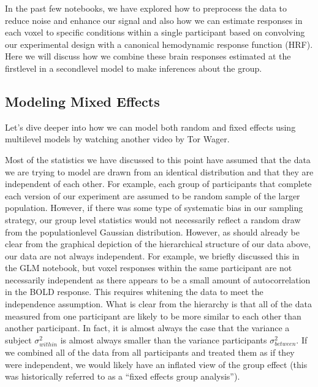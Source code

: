 \documentclass[letterpaper,10pt,english]{sphinxmanual}
\begin{document}

In the past few notebooks, we have explored how to preprocess the data to reduce noise and enhance our signal and also how we can estimate responses in each voxel to specific conditions within a single participant based on convolving our experimental design with a canonical hemodynamic response function (HRF). Here we will discuss how we combine these brain responses estimated at the first\sphinxhyphen{}level in a second\sphinxhyphen{}level model to make inferences about the group.


\subsection{Modeling Mixed Effects}
\label{\detokenize{content/Group_Analysis:modeling-mixed-effects}}
Let’s dive deeper into how we can model both random and fixed effects using multi\sphinxhyphen{}level models by watching another video by Tor Wager.

\begin{sphinxVerbatim}[commandchars=\\\{\}]
\end{sphinxVerbatim}

\noindent{}

Most of the statistics we have discussed to this point have assumed that the data we are trying to model are drawn from an identical distribution and that they are independent of each other. For example, each group of participants that complete each version of our experiment are assumed to be random sample of the larger population. However, if there was some type of systematic bias in our sampling strategy, our group level statistics would not necessarily reflect a random draw from the population\sphinxhyphen{}level Gaussian distribution. However, as should already be clear from the graphical depiction of the hierarchical structure of our data above, our data are not always independent. For example, we briefly discussed this in the GLM notebook, but voxel responses within the same participant are not necessarily independent as there appears to be a small amount of autocorrelation in the BOLD response. This requires whitening the data to meet the independence assumption. What is clear from the hierarchy is that all of the data measured from one participant are likely to be more similar to each other than another participant. In fact, it is almost always the case that the variance  a subject \(\sigma_{within}^2\) is almost always smaller than the variance  participants \(\sigma_{between}^2\). If we combined all of the data from all participants and treated them as if they were independent, we would likely have an inflated view of the group effect (this was historically referred to as a “fixed effects group analysis”).
\end{document}
